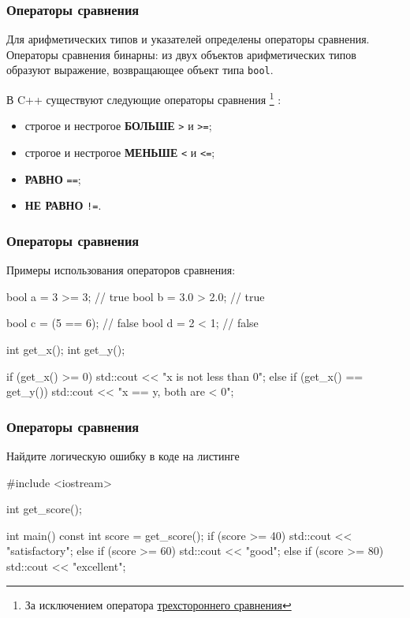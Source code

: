 \documentclass[compress, 8pt, aspectratio=169]{beamer}
\begin{document}
\begin{frame}[fragile]

    \frametitle{Операторы сравнения}

    Для арифметических типов и указателей определены операторы сравнения.
    Операторы сравнения бинарны: из двух объектов арифметических типов образуют
    выражение, возвращающее объект типа \verb|bool|.

    \hfill\break
    В C++ существуют следующие операторы сравнения
    \footnote{За исключением оператора
        \href{https://en.cppreference.com/w/cpp/language/operator\_comparison}{трехстороннего сравнения}}
    :

    \begin{itemize}
        \item строгое и нестрогое \textbf{БОЛЬШЕ} \verb|>| и \verb|>=|;
        \item строгое и нестрогое \textbf{МЕНЬШЕ} \verb|<| и \verb|<=|;
        \item \textbf{РАВНО} \verb|==|;
        \item \textbf{НЕ РАВНО} \verb|!=|.
    \end{itemize}

\end{frame}

\begin{frame}[fragile]

    \frametitle{Операторы сравнения}

    Примеры использования операторов сравнения:

    \begin{myinplacelisting}[minted language=cpp]
bool a = 3 >= 3;    // true
bool b = 3.0 > 2.0; // true

bool c = (5 == 6);  // false
bool d = 2 < 1;     // false

int get_x();
int get_y();

if (get_x() >= 0) {
    std::cout << "x is not less than 0\n";
}
else if (get_x() == get_y()) {
    std::cout << "x == y, both are < 0\n";
}
    \end{myinplacelisting}

\end{frame}

\begin{frame}[fragile]

    \frametitle{Операторы сравнения}

    \begin{task}
        Найдите логическую ошибку в коде на листинге
    \end{task}

    \begin{myinplacelisting}[minted language=cpp]
#include <iostream>

int get_score();

int main() {
    const int score = get_score();
    if (score >= 40) {
        std::cout << "satisfactory\n";
    }
    else if (score >= 60) {
        std::cout << "good\n";
    }
    else if (score >= 80) {
        std::cout << "excellent\n";
    }
}
    \end{myinplacelisting}

\end{frame}
\end{document}
